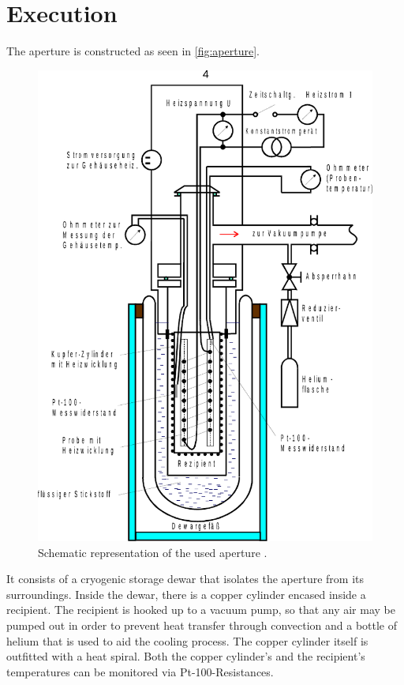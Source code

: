 \section{Execution}
\label{sec:Durchführung}

The aperture is constructed as seen in \autoref{fig:aperture}.

\begin{figure}[H]
    \centering
    \includegraphics[]{figures/apparature.pdf}
    \caption{Schematic representation of the used aperture \cite{v47}.}
    \label{fig:aperture}
\end{figure}

It consists of a cryogenic storage dewar that isolates the aperture from its surroundings. Inside the dewar, there is a copper cylinder encased inside a recipient.
The recipient is hooked up to a vacuum pump, so that any air may be pumped out in order to prevent heat transfer through convection and a bottle of helium that is used to aid the cooling process.
The copper cylinder itself is outfitted with a heat spiral.
Both the copper cylinder's and the recipient's temperatures can be monitored via Pt-100-Resistances. \\

